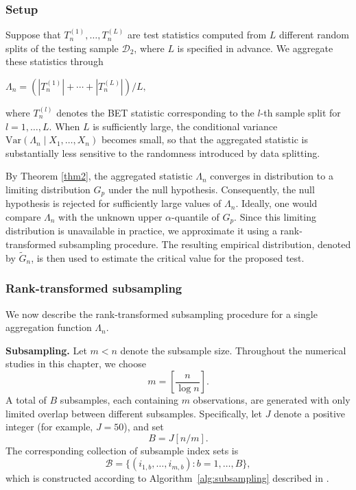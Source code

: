 \documentclass[12pt,reqno,oneside]{amsbook}
\theoremstyle{definition}
\theoremstyle{remark}
\begin{document}
\subsubsection{Setup}

Suppose that $T_n^{(1)},\ldots,T_n^{(L)}$ are test statistics computed from $L$ different random splits of the testing sample $\mathcal{D}_2$, where $L$ is specified in advance. We aggregate these statistics through
\begin{center}
    $\Lambda_n = ( |T_n^{(1)}|+\cdots+|T_n^{(L)}| )/L,$
\end{center}
where $T_n^{(l)}$ denotes the BET statistic corresponding to the $l$-th sample split for $l=1,\ldots,L$. When $L$ is sufficiently large, the conditional variance
$\mathrm{Var}(\Lambda_n \mid X_1,\ldots,X_n)$
becomes small, so that the aggregated statistic is substantially less sensitive to the randomness introduced by data splitting.

\hspace{0.5cm}
By Theorem \ref{thm2}, the aggregated statistic $\Lambda_n$ converges in distribution to a limiting distribution $G_p$ under the null hypothesis. Consequently, the null hypothesis is rejected for sufficiently large values of $\Lambda_n$. Ideally, one would compare $\Lambda_n$ with the unknown upper $\alpha$-quantile of $G_p$. Since this limiting distribution is unavailable in practice, we approximate it using a rank-transformed subsampling procedure. The resulting empirical distribution, denoted by $\tilde{G}_n$, is then used to estimate the critical value for the proposed test.

\subsubsection{Rank-transformed subsampling}

We now describe the rank-transformed subsampling procedure for a single aggregation function $\Lambda_n$.

\hspace{0.5cm}
\textbf{Subsampling.}
Let $m<n$ denote the subsample size. Throughout the numerical studies in this chapter, we choose
\[
m=\left[\frac{n}{\log n}\right].
\]
A total of $B$ subsamples, each containing $m$ observations, are generated with only limited overlap between different subsamples. Specifically, let $J$ denote a positive integer (for example, $J=50$), and set
\[
B=J[n/m].
\]
The corresponding collection of subsample index sets is
\[
\mathcal{B}
=
\{(i_{1,b},\ldots,i_{m,b}):b=1,\ldots,B\},
\]
which is constructed according to Algorithm~\ref{alg:subsampling} described in \cite{guo2024ranktransformed}.
\end{document}
